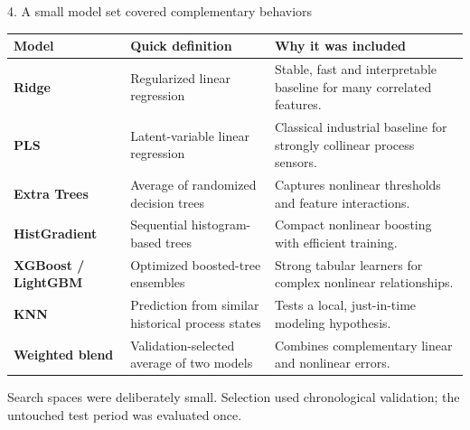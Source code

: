 \documentclass[10pt,aspectratio=169]{beamer}
\newcommand{\smallnote}[1]{{\scriptsize\color{Gray}#1}}
\begin{document}
\begin{frame}{4. A small model set covered complementary behaviors}
  \small
  \begin{tabular}{>{\bfseries}L{0.18\textwidth}L{0.30\textwidth}L{0.44\textwidth}}
    \toprule
    Model & Quick definition & Why it was included \\
    \midrule
    Ridge & Regularized linear regression & Stable, fast and interpretable baseline for many correlated features. \\
    PLS & Latent-variable linear regression & Classical industrial baseline for strongly collinear process sensors. \\
    Extra Trees & Average of randomized decision trees & Captures nonlinear thresholds and feature interactions. \\
    HistGradient & Sequential histogram-based trees & Compact nonlinear boosting with efficient training. \\
    XGBoost / LightGBM & Optimized boosted-tree ensembles & Strong tabular learners for complex nonlinear relationships. \\
    KNN & Prediction from similar historical process states & Tests a local, just-in-time modeling hypothesis. \\
    Weighted blend & Validation-selected average of two models & Combines complementary linear and nonlinear errors. \\
    \bottomrule
  \end{tabular}

  \vfill
  \smallnote{Search spaces were deliberately small. Selection used chronological validation; the untouched test period was evaluated once.}
\end{frame}
\end{document}
